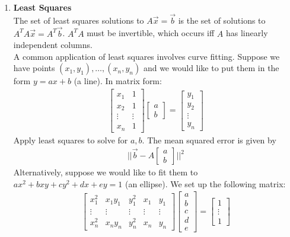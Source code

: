\documentclass[10pt]{article}
\newcommand{\norm}[1]{\lvert #1 \rvert}
\begin{document}
\begin{multicols}{2}
\begin{enumerate}
    \item \textbf{Least Squares} \\ The set of least squares solutions to $A\vec{x}=\vec{b}$ is the set of solutions to $A^TA\vec{x}=A^T\vec{b}$. $A^TA$ must be invertible, which occurs iff $A$ has linearly independent columns. \\ A common application of least squares involves curve fitting. Suppose we have points $\left( x_1, y_1 \right), \hdots, \left( x_n, y_n \right)$ and we would like to put them in the form $y=ax+b$ (a line). In matrix form:
    \begin{align*}
        \begin{bmatrix}
        x_1 & 1 \\
        x_2 & 1 \\
        \vdots & \vdots \\
        x_n & 1
        \end{bmatrix}
        \begin{bmatrix}
        a \\
        b
        \end{bmatrix} = 
        \begin{bmatrix}
        y_1 \\ y_2 \\ \vdots \\ y_n
        \end{bmatrix}
    \end{align*}
    Apply least squares to solve for $a,b$. The mean squared error is given by 
    \begin{align*}
        \norm{\norm{\vec{b} - A\begin{bmatrix} a \\ b \end{bmatrix}}}^2
    \end{align*}
    Alternatively, suppose we would like to fit them to $ax^2+bxy+cy^2+dx+ey=1$ (an ellipse). We set up the following matrix:
    \begin{align*}
        \begin{bmatrix} 
        x^2_1 & x_1y_1 & y^2_1 & x_1 & y_1 \\
        \vdots & \vdots & \vdots & \vdots & \vdots \\
        x^2_n & x_ny_n & y^2_n & x_n & y_n
        \end{bmatrix}
        \begin{bmatrix} 
        a \\ b \\ c \\ d \\ e
        \end{bmatrix} =
        \begin{bmatrix} 1 \\ \vdots \\ 1 \end{bmatrix}
    \end{align*}
    

\end{enumerate}
\end{multicols}
\end{document}
